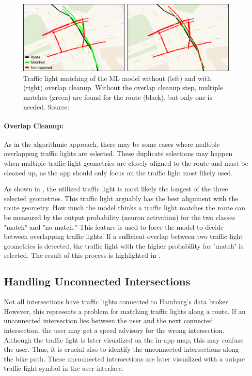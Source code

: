 \begin{figure}[t]
\centering
\includegraphics[width=\linewidth]{images/sg-selection-overlap-cleanup.pdf}
\caption{Traffic light matching of the ML model without (left) and with (right) overlap cleanup. Without the overlap cleanup step, multiple matches (green) are found for the route (black), but only one is needed. Source: \cite{matthes2023geo}}
\label{fig:sg-selection-overlap-cleanup}
\end{figure}

\paragraph{Overlap Cleanup:} As in the algorithmic approach, there may be some cases where multiple overlapping traffic lights are selected. These duplicate selections may happen when multiple traffic light geometries are closely aligned to the route and must be cleaned up, as the app should only focus on the traffic light most likely used. 

As shown in , the utilized traffic light is most likely the longest of the three selected geometries. This traffic light arguably has the best alignment with the route geometry. How much the model thinks a traffic light matches the route can be measured by the output probability (neuron activation) for the two classes "match" and "no match." This feature is used to force the model to decide between overlapping traffic lights. If a sufficient overlap between two traffic light geometries is detected, the traffic light with the higher probability for "match" is selected. The result of this process is highlighted in .

\subsection{Handling Unconnected Intersections}

Not all intersections have traffic lights connected to Hamburg's data broker. However, this represents a problem for matching traffic lights along a route. If an unconnected intersection lies between the user and the next connected intersection, the user may get a speed advisory for the wrong intersection. Although the traffic light is later visualized on the in-app map, this may confuse the user. Thus, it is crucial also to identify the unconnected intersections along the bike path. These unconnected intersections are later visualized with a unique traffic light symbol in the user interface.

